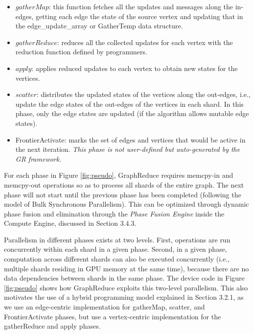 \begin{itemize}
  \item    $gatherMap$: this function fetches all the updates and messages along the in-edges, getting each edge the state of the source vertex and updating that in the edge\_update\_array or GatherTemp data structure. 
  \item $gatherReduce$: reduces all the collected updates for each vertex with the reduction function defined by programmers. 
  \item  $apply$: applies reduced updates to each vertex to obtain new states for the vertices. 
 \item  $scatter$: distributes the updated states of the vertices along the out-edges, i.e., update the edge states of the out-edges of the vertices in each shard. In this phase, only the edge states are updated (if the algorithm allows mutable edge states). 
\item FrontierActivate: marks the set of edges and vertices that would be active in the next iteration. \textit{This phase is not user-defined but auto-generated by the GR framework}.
\end{itemize}




For each phase in Figure \ref{fig:pseudo}, GraphReduce requires memcpy-in and memcpy-out operations so as to process all shards
of the entire graph. The next phase will not start until the previous phase has been completed (following the model of 
Bulk Synchronous Parallelism). This can be optimized through dynamic phase fusion and elimination through the \textit{Phase Fusion Engine} inside the Compute Engine, discussed in Section 3.4.3. 

Parallelism in different phases exists at two levels. First, operations are run concurrently within each shard in a given phase.
Second, in a given phase, computation across different shards can also be executed concurrently (i.e., multiple shards residing 
in GPU memory at the same time), because there are no data dependencies between shards in the same phase. 
The device code in Figure \ref{fig:pseudo} shows how GraphReduce exploits this two-level parallelism. This also motivates 
the use of a hybrid programming model explained in Section 3.2.1, as we use an edge-centric implementation for gatherMap, 
scatter, and FrontierActivate phases, but use a vertex-centric implementation for the gatherReduce and apply phases.

